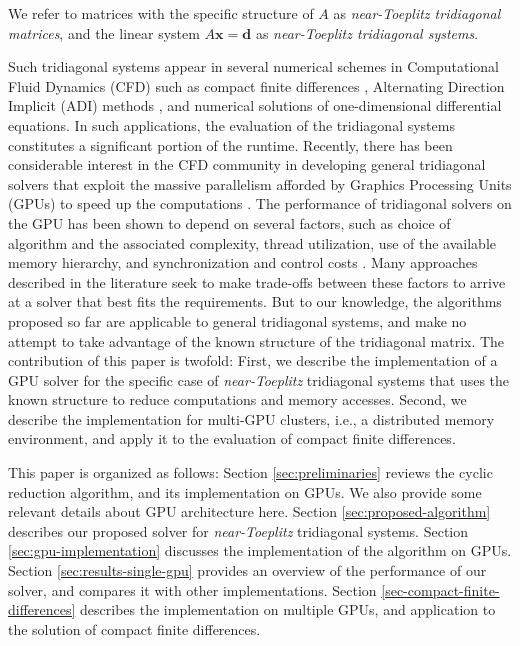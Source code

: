 \documentclass{elsarticle}
\begin{document}
We refer to matrices with the specific structure of $A$
as \emph{near-Toeplitz tridiagonal matrices},
and the linear system $A\bm{x}=\bm{d}$ as \emph{near-Toeplitz tridiagonal systems}.

Such tridiagonal systems
appear in several numerical schemes
in Computational Fluid Dynamics (CFD)
such as
compact finite differences
\cite{lele1992compact,kennedy1994several},
Alternating Direction Implicit (ADI) methods \cite{1955ADI}, and
numerical solutions of one-dimensional differential equations.
In such applications,
the evaluation of the tridiagonal systems constitutes
a significant portion of the runtime.
Recently, there has been considerable interest in the CFD community
in developing general tridiagonal solvers that
exploit the massive parallelism afforded by
Graphics Processing Units (GPUs)
to speed up the computations
\cite{tutkun2012gpu,esfahanian2014efficient,GoSt11CR}.
The performance of tridiagonal solvers on the GPU
has been shown to depend on several factors,
such as
choice of algorithm and the associated complexity,
thread utilization,
use of the available memory hierarchy,
and synchronization and control costs
\cite{Zhang2010FTS}.
Many approaches described in the literature
seek to make trade-offs between these factors
to arrive at a solver that best fits the requirements.
But to our knowledge,
the algorithms proposed so far
are applicable to general tridiagonal systems,
and make no attempt to take advantage of
the known structure of the tridiagonal matrix.
The contribution of this paper is twofold:
First, we describe the implementation of a GPU solver
for the specific case of \emph{near-Toeplitz} tridiagonal systems
that uses the known structure to reduce
computations and memory accesses.
Second, we describe the implementation for
multi-GPU clusters, i.e., a distributed memory environment,
and apply it to the evaluation of compact finite differences.

This paper is organized as follows:
Section \ref{sec:preliminaries}
reviews the cyclic reduction algorithm,
and its implementation on GPUs.
We also provide some relevant details about GPU architecture here.
Section \ref{sec:proposed-algorithm}
describes our proposed solver for \emph{near-Toeplitz} tridiagonal systems.
Section \ref{sec:gpu-implementation}
discusses the implementation of the algorithm on GPUs.
Section \ref{sec:results-single-gpu}
provides an overview of the performance of our solver,
and compares it with other implementations.
Section \ref{sec-compact-finite-differences}
describes the implementation on multiple GPUs,
and application to the solution of compact finite differences.
\end{document}

